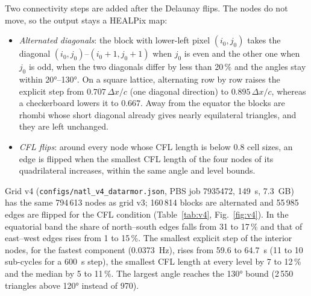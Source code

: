\documentclass[11pt,a4paper]{article}
\begin{document}
Two connectivity steps are added after the Delaunay flips. The nodes do
not move, so the output stays a HEALPix map:
\begin{itemize}
\item \emph{Alternated diagonals}: the block with lower-left pixel
  $(i_0,j_0)$ takes the diagonal $(i_0,j_0)$--$(i_0{+}1,j_0{+}1)$ when $j_0$
  is even and the other one when $j_0$ is odd, when the two diagonals
  differ by less than 20\,\% and the angles stay within
  \ang{20}--\ang{130}. On a square lattice, alternating row by row raises
  the explicit step from $0.707\,\Delta x/c$ (one diagonal direction) to
  $0.895\,\Delta x/c$, whereas a checkerboard lowers it to $0.667$. Away
  from the equator the blocks are rhombi whose short diagonal already
  gives nearly equilateral triangles, and they are left unchanged.
\item \emph{CFL flips}: around every node whose CFL length is below 0.8
  cell sizes, an edge is flipped when the smallest CFL length of the four
  nodes of its quadrilateral increases, within the same angle and level
  bounds.
\end{itemize}

Grid v4 (\texttt{configs/natl\_v4\_datarmor.json}, PBS job 7935472,
\SI{149}{s}, \SI{7.3}{GB}) has the same 794\,613 nodes as grid v3;
160\,814 blocks are alternated and 55\,985 edges are flipped for the CFL
condition (Table~\ref{tab:v4}, Fig.~\ref{fig:v4}). In the equatorial band
the share of north--south edges falls from 31 to 17\,\% and that of
east--west edges rises from 1 to 15\,\%. The smallest explicit step of the
interior nodes, for the fastest component (\SI{0.0373}{Hz}), rises from
59.6 to \SI{64.7}{s}
(11 to 10 sub-cycles for a \SI{600}{s} step), the smallest CFL length at
every level by 7 to 12\,\% and the median by 5 to 11\,\%. The largest
angle reaches the \ang{130} bound (2\,550 triangles above \ang{120}
instead of 970).
\end{document}
